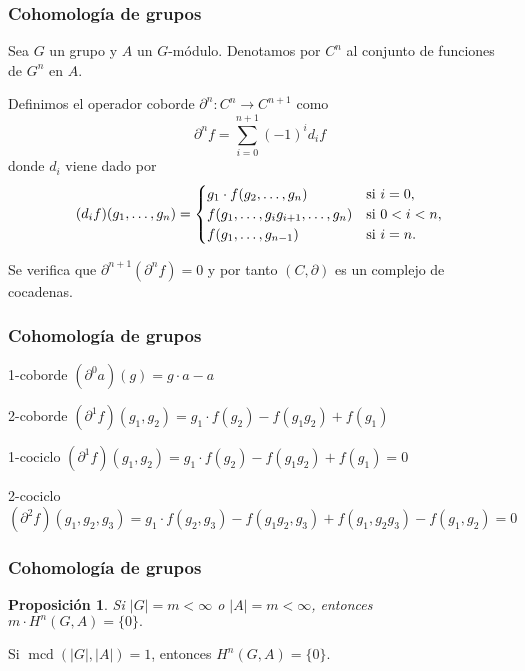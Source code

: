 \documentclass[
	11pt, %
]{beamer}
\DeclareMathOperator{\mcd}{mcd}
\newcommand{\ord}[1]{\left|#1\right|}%
\newcommand{\homo}[3]{#1\colon #2\to #3}
\newtheorem{proposition}{Proposici\'on}
\begin{document}
\begin{frame}
	\frametitle{Cohomología de grupos}
	
	Sea $G$ un grupo y $A$ un $G$-módulo. Denotamos por $C^n$ al conjunto de funciones de $G^n$ en $A$.
	
	Definimos el operador coborde  $\homo {\partial^n} {C^n} {C^{n+1}}$ como
	\begin{equation*}
		\partial^n f = \sum\limits_{i=0}^{n+1} (-1)^{i} d_i f
	\end{equation*}
	donde $d_i$ viene dado por 
	\begin{equation*}
		(d_if)(g_1,\ldots,g_n) = 
		\begin{cases} 
			g_1\cdot f(g_2,\ldots,g_n) 				& \text{si $ i=0$}, \\
			f(g_1,\ldots,g_ig_{i+1},\ldots,g_n) 	& \text{si $ 0 < i <n$}, \\
			f(g_1,\ldots,g_{n-1}) 				& \text{si $ i=n$}.
		\end{cases}
	\end{equation*}
	
	Se verifica que $\partial^{n+1}(\partial^n f) = 0$ y por tanto $(C,\partial)$ es un complejo de cocadenas.
\end{frame}

\begin{frame}
	\frametitle{Cohomología de grupos}
	
	\begin{exampleblock}{1-coborde}
		 \centering$(\partial^0 a)(g) = g\cdot a - a$
	\end{exampleblock}
	\begin{exampleblock}{2-coborde}
		 \centering$(\partial^1 f)(g_1,g_2) = g_1\cdot f(g_2) - f(g_1g_2) + f(g_1)$
	\end{exampleblock}
	\begin{exampleblock}{1-cociclo}
		 \centering$(\partial^1 f)(g_1,g_2) = g_1\cdot f(g_2) - f(g_1g_2) + f(g_1) = 0$
	\end{exampleblock}
	\begin{exampleblock}{2-cociclo}
		 \centering$(\partial^2 f)(g_1,g_2,g_3) = g_1\cdot f(g_2,g_3) - f(g_1g_2,g_3) + f(g_1,g_2g_3) - f(g_1,g_2)=0$
	\end{exampleblock}
	
\end{frame}

\begin{frame}
	\frametitle{Cohomología de grupos}
	
	\begin{proposition}
		Si $\ord{G} = m<\infty$ o $\ord{A} = m<\infty$, entonces $m\cdot H^{n}(G,A) = \{0\}.$
	\end{proposition}
	
	\begin{theorem}
		Si $\mcd(\ord{G},\ord{A}) = 1$, entonces $H^{n}(G,A) = \{0\}.$
	\end{theorem}
\end{frame}
\end{document}
